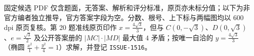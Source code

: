 

\begin{gktip}
固定候选 PDF 仅含题面，无答案、解析和评分标准，原页亦未标分值；以下为非官方编者独立推导，官方答案字段为空。分数、根号、上下标与两幅图均以 600 dpi 原页复核。第 20 题准线原页印作 $x=\frac{4\sqrt3}3$，但与 $C(0,-\sqrt3)$、$D(0,\sqrt3)$、$e=\frac{\sqrt3}2$ 及公开答案册的 $|MC|\cdot|MD|$ 最大值 $4$ 矛盾；按唯一自洽的 $y=\frac{4\sqrt3}3$（椭圆 $\frac{x^2}1+\frac{y^2}4=1$）求解，并登记 \texttt{ISSUE-1516}。
\end{gktip}

